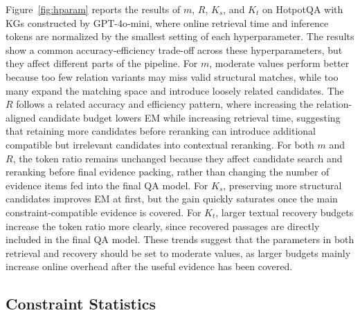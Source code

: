 \documentclass{article}
\theoremstyle{plain}
\theoremstyle{definition}
\theoremstyle{remark}
\begin{document}
Figure~\ref{fig:hparam} reports the results of $m$, $R$, $K_s$, and $K_t$ on HotpotQA with KGs constructed by GPT-4o-mini, where online retrieval time and inference tokens are normalized by the smallest setting of each hyperparameter. The results show a common accuracy-efficiency trade-off across these hyperparameters, but they affect different parts of the pipeline. 
For $m$, moderate values perform better because too few relation variants may miss valid structural matches, while too many expand the matching space and introduce loosely related candidates. The $R$ follows a related accuracy and efficiency pattern, where increasing the relation-aligned candidate budget lowers EM while increasing retrieval time, suggesting that retaining more candidates before reranking can introduce additional compatible but irrelevant candidates into contextual reranking. 
For both $m$ and $R$, the token ratio remains unchanged because they affect candidate search and reranking before final evidence packing, rather than changing the number of evidence items fed into the final QA model. For $K_s$, preserving more structural candidates improves EM at first, but the gain quickly saturates once the main constraint-compatible evidence is covered. For $K_t$, larger textual recovery budgets increase the token ratio more clearly, since recovered passages are directly included in the final QA model. 
These trends suggest that the parameters in both retrieval and recovery should be set to moderate values, as larger budgets mainly increase online overhead after the useful evidence has been covered.

\subsection{Constraint Statistics}
\label{appsec:decomp_stats}
\end{document}
